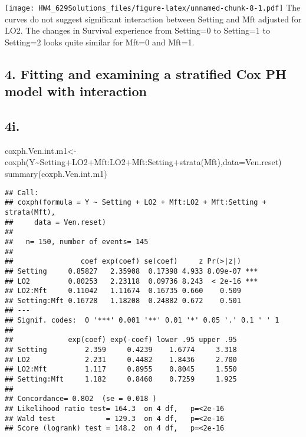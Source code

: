 \documentclass[
]{article}
\newenvironment{Shaded}{\begin{snugshade}}{\end{snugshade}}
\newcommand{\AttributeTok}[1]{\textcolor[rgb]{0.77,0.63,0.00}{#1}}
\newcommand{\FunctionTok}[1]{\textcolor[rgb]{0.00,0.00,0.00}{#1}}
\newcommand{\NormalTok}[1]{#1}
\newcommand{\OtherTok}[1]{\textcolor[rgb]{0.56,0.35,0.01}{#1}}
\newcommand{\SpecialCharTok}[1]{\textcolor[rgb]{0.00,0.00,0.00}{#1}}
\begin{document}
\texttt{[image: HW4\_629Solutions\_files/figure-latex/unnamed-chunk-8-1.pdf]}
The curves do not suggest significant interaction between Setting and
Mft adjusted for LO2. The changes in Survival experience from Setting=0
to Setting=1 to Setting=2 looks quite similar for Mft=0 and Mft=1.

\hypertarget{fitting-and-examining-a-stratified-cox-ph-model-with-interaction}{%
\subsection{4. Fitting and examining a stratified Cox PH model with
interaction}\label{fitting-and-examining-a-stratified-cox-ph-model-with-interaction}}

\hypertarget{i.}{%
\subsection{4i.}\label{i.}}

\begin{Shaded}
\begin{Highlighting}[]
\NormalTok{coxph.Ven.int.m1}\OtherTok{\textless{}{-}}\FunctionTok{coxph}\NormalTok{(Y}\SpecialCharTok{\textasciitilde{}}\NormalTok{Setting}\SpecialCharTok{+}\NormalTok{LO2}\SpecialCharTok{+}\NormalTok{Mft}\SpecialCharTok{:}\NormalTok{LO2}\SpecialCharTok{+}\NormalTok{Mft}\SpecialCharTok{:}\NormalTok{Setting}\SpecialCharTok{+}\FunctionTok{strata}\NormalTok{(Mft),}\AttributeTok{data=}\NormalTok{Ven.reset)}
\FunctionTok{summary}\NormalTok{(coxph.Ven.int.m1)}
\end{Highlighting}
\end{Shaded}

\begin{verbatim}
## Call:
## coxph(formula = Y ~ Setting + LO2 + Mft:LO2 + Mft:Setting + strata(Mft), 
##     data = Ven.reset)
## 
##   n= 150, number of events= 145 
## 
##                coef exp(coef) se(coef)     z Pr(>|z|)    
## Setting     0.85827   2.35908  0.17398 4.933 8.09e-07 ***
## LO2         0.80253   2.23118  0.09736 8.243  < 2e-16 ***
## LO2:Mft     0.11042   1.11674  0.16735 0.660    0.509    
## Setting:Mft 0.16728   1.18208  0.24882 0.672    0.501    
## ---
## Signif. codes:  0 '***' 0.001 '**' 0.01 '*' 0.05 '.' 0.1 ' ' 1
## 
##             exp(coef) exp(-coef) lower .95 upper .95
## Setting         2.359     0.4239    1.6774     3.318
## LO2             2.231     0.4482    1.8436     2.700
## LO2:Mft         1.117     0.8955    0.8045     1.550
## Setting:Mft     1.182     0.8460    0.7259     1.925
## 
## Concordance= 0.802  (se = 0.018 )
## Likelihood ratio test= 164.3  on 4 df,   p=<2e-16
## Wald test            = 129.3  on 4 df,   p=<2e-16
## Score (logrank) test = 148.2  on 4 df,   p=<2e-16
\end{verbatim}
\end{document}
